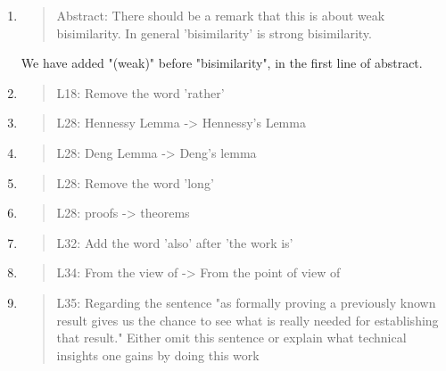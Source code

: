 \begin{enumerate}
\item \begin{quote}
    Abstract:
    There should be a remark that this is about weak bisimilarity. In
    general 'bisimilarity' is strong bisimilarity.
  \end{quote}

  We have added "(weak)" before "bisimilarity", in the first line of abstract.

\item \begin{quote}
    L18: Remove the word 'rather'
  \end{quote}

\item \begin{quote}
    L28: Hennessy Lemma -> Hennessy's Lemma
  \end{quote}

\item \begin{quote}
    L28: Deng Lemma -> Deng's lemma
  \end{quote}

\item \begin{quote}
    L28: Remove the word 'long'
  \end{quote}

\item \begin{quote}
    L28: proofs -> theorems
  \end{quote}

\item \begin{quote}
    L32: Add the word 'also' after 'the work is'
  \end{quote}

\item \begin{quote}
    L34: From the view of -> From the point of view of
  \end{quote}

\item \begin{quote}
    L35: Regarding the sentence "as formally proving a previously known result gives us the chance to see
    what is really needed for establishing that result."
    Either omit this sentence or explain what technical insights one
    gains by doing this work
  \end{quote}


\end{enumerate}
